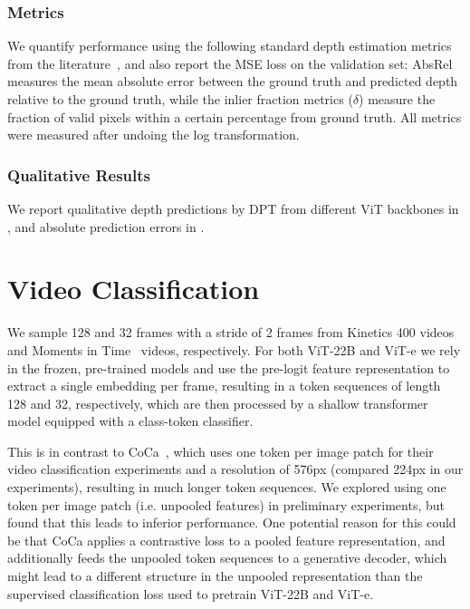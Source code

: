 \documentclass{article}
\begin{document}
\subsubsection{Metrics}

We quantify performance using the following standard depth estimation metrics from the literature~\citep{hermann2020self, eigen2014depth}, and also report the MSE loss on the validation set:
AbsRel measures the mean absolute error between the ground truth and predicted depth relative to the ground truth, while the inlier fraction metrics ($\delta$) measure the fraction of valid pixels within a certain 
percentage
from ground truth.
All metrics were measured after undoing the log transformation.

\subsubsection{Qualitative Results}

We report qualitative depth predictions by DPT from different ViT backbones in , and absolute prediction errors in .
\section{Video Classification}
\label{sec:app_video_classification}

We sample 128 and 32 frames with a stride of 2 frames from Kinetics 400 videos~\citep{kay2017kinetics} and Moments in Time~\citep{monfort2019moments} videos, respectively. For both ViT-22B and ViT-e we rely in the frozen, pre-trained models and use the pre-logit feature representation to extract a single embedding per frame, resulting in a token sequences of length 128 and 32, respectively, which are then processed by a shallow transformer model equipped with a class-token classifier.

This is in contrast to CoCa~\citep{yu2022coca}, which uses one token per image patch for their video classification experiments and a resolution of 576px (compared 224px in our experiments), resulting in much longer token sequences. We explored using one token per image patch (i.e. unpooled features) in preliminary experiments, but found that this leads to inferior performance. One potential reason for this could be that CoCa applies a contrastive loss to a pooled feature representation, and additionally feeds the unpooled token sequences to a generative decoder, which might lead to a different structure in the unpooled representation than the supervised classification loss used to pretrain ViT-22B and ViT-e.
\end{document}
